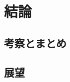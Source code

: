 \documentclass[Yonemoto_master.tex]{subfiles}
\begin{document}
\chapter{結論}
 \section{考察とまとめ}
 \section{展望}
\end{document}
